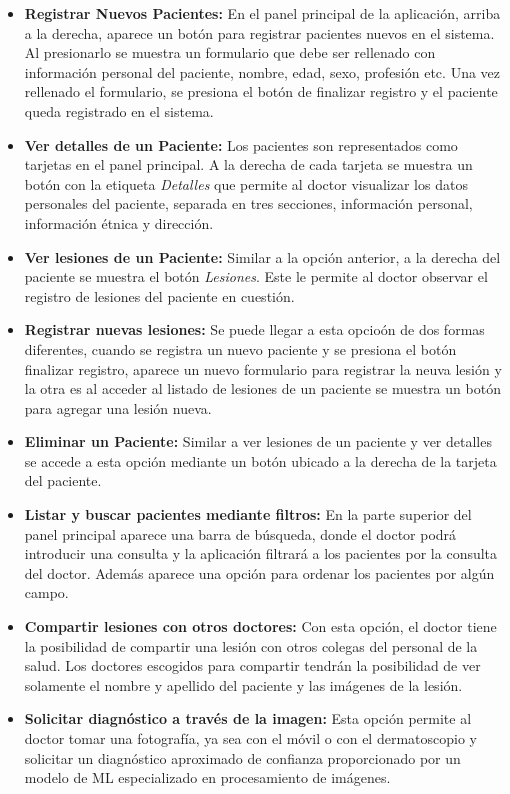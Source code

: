 \begin{itemize}
    \item \textbf{Registrar Nuevos Pacientes:} En el panel principal de la aplicaci\'on, arriba a la derecha, aparece un bot\'on para registrar pacientes nuevos en el sistema. Al presionarlo se muestra un formulario que debe ser rellenado con informaci\'on personal del paciente, nombre, edad, sexo, profesi\'on etc. Una vez rellenado el formulario, se presiona el bot\'on de finalizar registro y el paciente queda registrado en el sistema. 
    \item \textbf{Ver detalles de un Paciente:} Los pacientes son representados como tarjetas en el panel principal. A la derecha de cada tarjeta se muestra un bot\'on con la etiqueta \textit{Detalles} que permite al doctor visualizar los datos personales del paciente, separada en tres secciones, informaci\'on personal, informaci\'on \'etnica y direcci\'on.
    \item \textbf{Ver lesiones de un Paciente:} Similar a la opci\'on anterior, a la derecha del paciente se muestra el bot\'on \textit{Lesiones}. Este le permite al doctor observar el registro de lesiones del paciente en cuesti\'on.
    \item \textbf{Registrar nuevas lesiones:} Se puede llegar a esta opcio\'on de dos formas diferentes, cuando se registra un nuevo paciente y se presiona el bot\'on finalizar registro, aparece un nuevo formulario para registrar la neuva lesi\'on y la otra es al acceder al listado de lesiones de un paciente se muestra un bot\'on para agregar una lesi\'on nueva. 
    \item \textbf{Eliminar un Paciente:} Similar a ver lesiones de un paciente y ver detalles se accede a esta opci\'on mediante un bot\'on ubicado a la derecha de la tarjeta del paciente.
    \item \textbf{Listar y buscar pacientes mediante filtros:} En la parte superior del panel principal aparece una barra de b\'usqueda, donde el doctor podr\'a introducir una consulta y la aplicaci\'on filtrar\'a a los pacientes por la consulta del doctor. Adem\'as aparece una opci\'on para ordenar los pacientes por alg\'un campo.
    \item \textbf{Compartir lesiones con otros doctores:} Con esta opci\'on, el doctor tiene la posibilidad de compartir una lesi\'on con otros colegas del personal de la salud. Los doctores escogidos para compartir tendr\'an la posibilidad de ver solamente el nombre y apellido del paciente y las im\'agenes de la lesi\'on.
    \item \textbf{Solicitar diagn\'ostico a trav\'es de la imagen:} Esta opci\'on permite al doctor tomar una fotograf\'ia, ya sea con el m\'ovil o con el dermatoscopio y solicitar un diagn\'ostico aproximado de confianza proporcionado por un modelo de ML especializado en procesamiento de im\'agenes.
\end{itemize}

